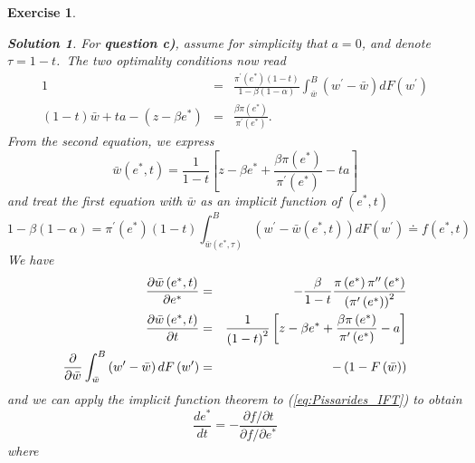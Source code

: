\documentclass[11pt]{article}
\newtheorem{exercise}[theorem]{Exercise}
\newtheorem{solution}[theorem]{Solution}
\begin{document}
\begin{exercise}
\begin{solution}
For \textbf{question c)}, assume for simplicity that $a=0$, and denote $\tau
=1-t$.\ The two optimality conditions now read%
\begin{eqnarray*}
1 &=&\frac{\pi ^{\prime }\left( e^{\ast }\right) \left( 1-t\right) }{1-\beta
\left( 1-\alpha \right) }\int_{\bar{w}}^{B}\left( w^{\prime }-\bar{w}\right)
dF\left( w^{\prime }\right)  \\
\left( 1-t\right) \bar{w}+ta-\left( z-\beta e^{\ast }\right)  &=&\frac{\beta
\pi \left( e^{\ast }\right) }{\pi ^{\prime }\left( e^{\ast }\right) }.
\end{eqnarray*}%
From the second equation, we express%
\begin{equation*}
\bar{w}\left( e^{\ast },t\right) =\frac{1}{1-t}\left[ z-\beta e^{\ast }+%
\frac{\beta \pi \left( e^{\ast }\right) }{\pi ^{\prime }\left( e^{\ast
}\right) }-ta\right] 
\end{equation*}%
and treat the first equation with $\bar{w}$ as an implicit function of $%
\left( e^{\ast },t\right) $%
\begin{equation}
1-\beta \left( 1-\alpha \right) =\pi ^{\prime }\left( e^{\ast }\right)
\left( 1-t\right) \int_{\bar{w}\left( e^{\ast },\tau \right) }^{B}\left(
w^{\prime }-\bar{w}\left( e^{\ast },t\right) \right) dF\left( w^{\prime
}\right) \doteq f\left( e^{\ast },t\right)   \label{eq:Pissarides_IFT}
\end{equation}%
We have%
\begin{eqnarray*}
\frac{\partial \bar{w}\left( e^{\ast },t\right) }{\partial e^{\ast }} &=&-%
\frac{\beta }{1-t}\frac{\pi \left( e^{\ast }\right) \pi ^{\prime \prime
}\left( e^{\ast }\right) }{\left( \pi ^{\prime }\left( e^{\ast }\right)
\right) ^{2}} \\
\frac{\partial \bar{w}\left( e^{\ast },t\right) }{\partial t} &=&\frac{1}{%
\left( 1-t\right) ^{2}}\left[ z-\beta e^{\ast }+\frac{\beta \pi \left(
e^{\ast }\right) }{\pi ^{\prime }\left( e^{\ast }\right) }-a\right]  \\
\frac{\partial }{\partial \bar{w}}\int_{\bar{w}}^{B}\left( w^{\prime }-\bar{w%
}\right) dF\left( w^{\prime }\right)  &=&-\left( 1-F\left( \bar{w}\right)
\right) 
\end{eqnarray*}%
and we can apply the implicit function theorem to (\ref{eq:Pissarides_IFT})
to obtain%
\begin{equation*}
\frac{de^{\ast }}{dt}=-\frac{\partial f/\partial t}{\partial f/\partial
e^{\ast }}
\end{equation*}%
where%
\begin{eqnarray*}

\end{eqnarray*}
\end{solution}
\end{exercise}
\end{document}
